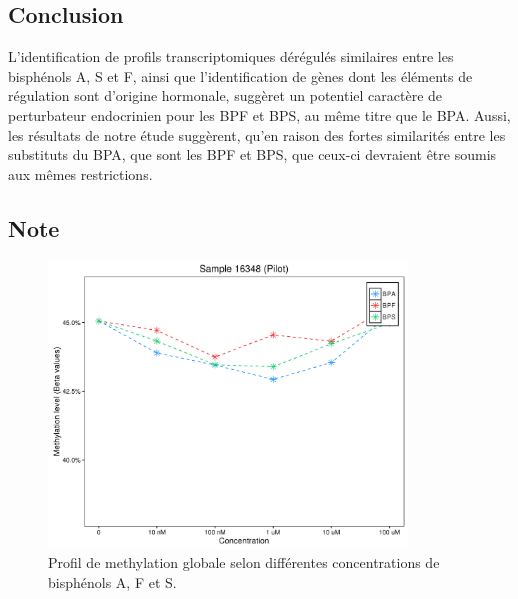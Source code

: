 \documentclass[11pt,a4paper,notrimn]{krantz}
\theoremstyle{definition}
\theoremstyle{definition}
\theoremstyle{remark}
\begin{document}
\subsection{Conclusion}\label{conclusion-3}

L'identification de profils transcriptomiques dérégulés similaires entre
les bisphénols A, S et F, ainsi que l'identification de gènes dont les
éléments de régulation sont d'origine hormonale, suggèret un potentiel
caractère de perturbateur endocrinien pour les BPF et BPS, au même titre
que le BPA. Aussi, les résultats de notre étude suggèrent, qu'en raison
des fortes similarités entre les substituts du BPA, que sont les BPF et
BPS, que ceux-ci devraient être soumis aux mêmes restrictions.

\subsection{Note}\label{note}




\begin{figure}[!htb]

{\centering \includegraphics[width=3.75in,height=3in]{FiguresTables/ScatterPlot_GlobMethSample_16348_PilotAll} 

}

\caption{Profil de methylation globale selon
différentes concentrations de bisphénols A, F et S.}\label{fig:ScatterPlotGlobMethSample}
\end{figure}
\end{document}

